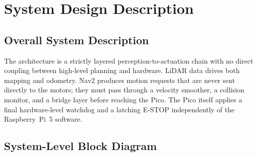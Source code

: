 \documentclass[12pt,a4paper]{report}
\begin{document}
\chapter{System Design Description}
\label{ch:design}

\section{Overall System Description}

The architecture is a strictly layered perception-to-actuation chain with no
direct coupling between high-level planning and hardware. LiDAR data drives both
mapping and odometry. Nav2 produces motion requests that are never sent directly
to the motors; they must pass through a velocity smoother, a collision monitor,
and a bridge layer before reaching the Pico. The Pico itself applies a final
hardware-level watchdog and a latching E-STOP independently of the Raspberry~Pi~5
software.

\section{System-Level Block Diagram}
\end{document}
